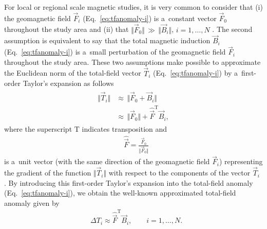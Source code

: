 \documentclass[journal abbreviation, npg]{copernicus}
\begin{document}
For local or regional scale magnetic studies, it is very common to consider
that (i) the geomagnetic field $\vec{F}_i$ (Eq.~\ref{eq:tfanomaly-i}) is
a~constant vector $\vec{F}_{0}$ throughout the study area and (ii) that
$\Vert \vec{F}_{0} \Vert\,\gg\, \Vert \vec{B}_{i} \Vert$, $i = 1, \ldots, N$
\citep{telford-etal1990,blakely1996}. The second assumption is equivalent to
say that the total magnetic induction $\vec{B}_i$ (Eq.~\ref{eq:tfanomaly-i})
is a~small perturbation of the geomagnetic field $\vec{F}_i$ throughout the
study area. These two assumptions make possible to approximate the Euclidean
norm of the total-field vector $\vec{T}_i$ (Eq.~\ref{eq:tfanomaly-i}) by
a~first-order Taylor's expansion as follows
\begin{align}
\begin{aligned}
\Vert \vec{T}_{i} \Vert & \approx\, \Vert \vec{F}_{0} + \vec{B}_{i} \Vert \\
 &\approx\, \Vert \vec{F}_{0} \Vert + \hat{\vec{F}}^{\mathrm{T}}\vec{B}_{i} ,
\end{aligned}
\label{eq:total-field-app}
\end{align}
where the superscript $\mathrm{T}$ indicates transposition and
\begin{align}
 &
\hat{\vec{F}} = \frac{\vec{F}_{0}}{\Vert \vec{F}_{0} \Vert}
\label{eq:unit-vector}
\end{align}
is a~unit vector (with the same direction of the geomagnetic field
$\vec{F}_i$) representing the gradient of the function $\Vert
\vec{T}_{i} \Vert$ with respect to the components of the vector
$\vec{T}_{i}$ \citep{blakely1996}. By introducing this first-order
Taylor's expansion into the total-field anomaly
(Eq.~\ref{eq:tfanomaly-i}), we obtain the well-known approximated
total-field anomaly given by
\begin{align}
 &
\Delta T_{i} \approx \hat{\vec{F}}^{\mathrm{T}}\vec{B}_{i} , \qquad i = 1, \ldots, N .
\label{eq:approx-tfanomaly-i}
\end{align}
\end{document}

